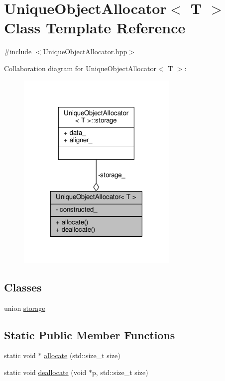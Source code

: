 \hypertarget{class_unique_object_allocator}{}\section{Unique\+Object\+Allocator$<$ T $>$ Class Template Reference}
\label{class_unique_object_allocator}


{\ttfamily \#include $<$Unique\+Object\+Allocator.\+hpp$>$}



Collaboration diagram for Unique\+Object\+Allocator$<$ T $>$\+:
\nopagebreak
\begin{figure}[H]
\begin{center}
\leavevmode
\includegraphics[width=218pt]{class_unique_object_allocator__coll__graph}
\end{center}
\end{figure}
\subsection*{Classes}
\begin{DoxyCompactItemize}
\item 
union \mbox{\hyperlink{union_unique_object_allocator_1_1storage}{storage}}
\end{DoxyCompactItemize}
\subsection*{Static Public Member Functions}
\begin{DoxyCompactItemize}
\item 
static void $\ast$ \mbox{\hyperlink{class_unique_object_allocator_a7baf5a708dcd516ce694499687e0cdc2}{allocate}} (std\+::size\+\_\+t size)
\item 
static void \mbox{\hyperlink{class_unique_object_allocator_a56c2cd1285c50ab8ed537aba9493b970}{deallocate}} (void $\ast$p, std\+::size\+\_\+t size)
\end{DoxyCompactItemize}
